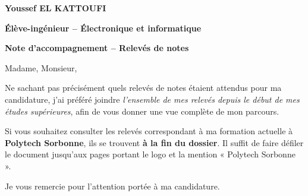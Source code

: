 \documentclass[10pt,a4paper]{article}
\begin{document}
{\fontsize{15.4}{17.2}\selectfont\bfseries\color{bleu}Youssef EL KATTOUFI}\par\vspace{2pt}
{\fontsize{10.1}{11.4}\selectfont\bfseries\color{rouge}Élève-ingénieur -- Électronique et informatique}\par\vspace{1pt}
{\fontsize{13}{15}\selectfont\bfseries\color{bleu}Note d'accompagnement -- Relevés de notes}\par
\vspace{11pt}
\fontsize{11}{14.6}\selectfont
Madame, Monsieur,

Ne sachant pas précisément quels relevés de notes étaient attendus pour ma candidature, j'ai préféré joindre \emph{l'ensemble de mes relevés depuis le début de mes études supérieures}, afin de vous donner une vue complète de mon parcours.

Si vous souhaitez consulter les relevés correspondant à ma formation actuelle à \textbf{Polytech Sorbonne}, ils se trouvent \textbf{à la fin du dossier}. Il suffit de faire défiler le document jusqu'aux pages portant le logo et la mention « Polytech Sorbonne ».

Je vous remercie pour l'attention portée à ma candidature.
\end{document}
